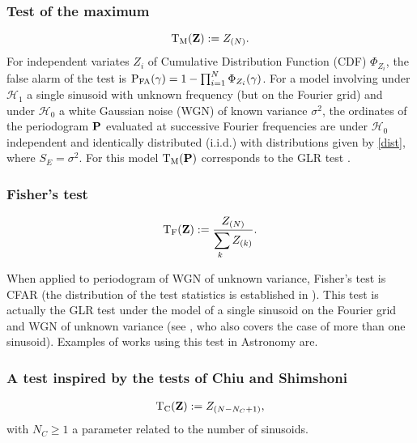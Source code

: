 \documentclass[journal]{IEEEtran}
\begin{document}
  
  
  \label{sec31}
   \subsubsection{ Test of the maximum}
   \label{Maxtest}

   \begin{equation}
	{\rm {T}_{M}}({\bf{Z}}) :=Z_{(N)}.
 	 \label{lemax}
\end{equation}
For independent variates $Z_i$ of Cumulative Distribution Function (CDF) $\Phi_{Z_i}$, the false alarm of the test is $ {\rm P_{FA}}(\gamma)=1-\prod_{i=1}^N \Phi_{Z_i}(\gamma)$. 
 For a model involving  under $\mathcal{H}_1$ a single sinusoid { with unknown  frequency (but on the Fourier grid) }and under  $\mathcal{H}_0$ a white Gaussian noise { (WGN)} of known variance $\sigma^2$, the ordinates of the periodogram ${\bf{P}}$  evaluated at successive Fourier frequencies are under  $\mathcal{H}_0$   independent and identically distributed (i.i.d.) with distributions given by \eqref{dist}, where $S_E=\sigma^2$.
  For this model  ${\rm T_M}({\bf{P}})$  corresponds to the GLR test  \cite{Kay_1998}. \\
  
 \subsubsection{Fisher's test}
\begin{equation} 
	\label{eq3b}
	{\rm {T}_{F}}({\bf{Z}}):= \frac{Z_{({N})}}{\displaystyle{\sum_{k ~ } Z_{(k)}}}.
\end{equation}

When applied to periodogram of { WGN} of unknown variance, Fisher's test is CFAR  (the distribution of the test statistics is established in \cite{Fisher_1929}). {This test is actually the GLR test under the model of a single sinusoid on the Fourier grid and WGN of unknown variance (see  \cite{Quinn_1986}, who also covers the case of more than one sinusoid).
}
 Examples of works using this test in Astronomy are\cite{Koen_2015a,Koen_2015b,Schwarzenberg_1998,Aittokallio_2001,Guitierrez_2009}. \\
 
  \subsubsection{A test inspired by the tests of Chiu and Shimshoni}
\begin{equation} 
\label{test_ch}  
      \begin{aligned}
{\rm T_C}({\bf{Z}}) := {Z_{({N}-N_C+1)}},
	\end{aligned}
\end{equation} 
 {with $N_C\geq 1$ a parameter related to the number of sinusoids. }
  
\end{document}
